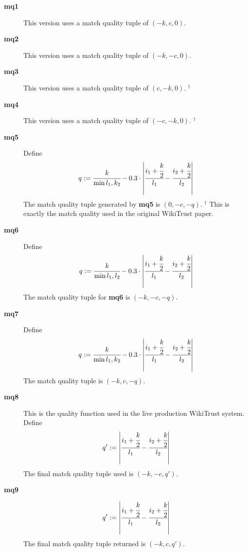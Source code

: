 \begin{description}
\item[\textbf{mq1}]
    This version uses a match quality tuple of $(-k, c, 0)$.

\item[\textbf{mq2}]
    This version uses a match quality tuple of $(-k, -c, 0)$.

\item[\textbf{mq3}]
    This version uses a match quality tuple of $(c, -k, 0)$.
    ${}^\dagger$

\item[\textbf{mq4}]
    This version uses a match quality tuple of $(-c, -k, 0)$.
    ${}^\dagger$

\item[\textbf{mq5}]
    Define
    \begin{equation*}
    q := \cfrac{k}{\min{l_1, k_2}} - 0.3 \cdot
        \left|\cfrac{ i_1 + \cfrac{k}{2} }{l_1}
            - \cfrac{ i_2 + \cfrac{k}{2} }{l_2} \right|
    \end{equation*}
    The match quality tuple generated by \textbf{mq5} is $(0, -c, -q)$.
    ${}^\dagger$
    This is exactly the match quality used in the original
    WikiTrust paper.

\item[\textbf{mq6}]
    Define
    \begin{equation*}
    q := \cfrac{k}{\min{l_1, l_2}} - 0.3 \cdot
        \left|\cfrac{ i_1 + \cfrac{k}{2} }{l_1}
            - \cfrac{ i_2 + \cfrac{k}{2} }{l_2} \right|
    \end{equation*}
    The match quality tuple for \textbf{mq6} is $(-k, -c, -q)$.

\item[\textbf{mq7}]
    Define
    \begin{equation*}
    q := \cfrac{k}{\min{l_1, k_2}} - 0.3 \cdot
        \left|\cfrac{ i_1 + \cfrac{k}{2} }{l_1}
            - \cfrac{ i_2 + \cfrac{k}{2} }{l_2} \right|
    \end{equation*}
    The match quality tuple is $(-k, c, -q)$.
\item[\textbf{mq8}] This is the quality function used in the
    live production WikiTrust system.
    Define
    \begin{equation*}
    q' := \left|\cfrac{ i_1 + \cfrac{k}{2} }{l_1}
            - \cfrac{ i_2 + \cfrac{k}{2} }{l_2} \right|
    \end{equation*}
    The final match quality tuple used is $(-k, -c, q')$.

\item[\textbf{mq9}]
    \begin{equation*}
    q' := \left|\cfrac{ i_1 + \cfrac{k}{2} }{l_1}
            - \cfrac{ i_2 + \cfrac{k}{2} }{l_2} \right|
    \end{equation*}
    The final match quality tuple returned is $(-k, c, q')$.
\end{description}


